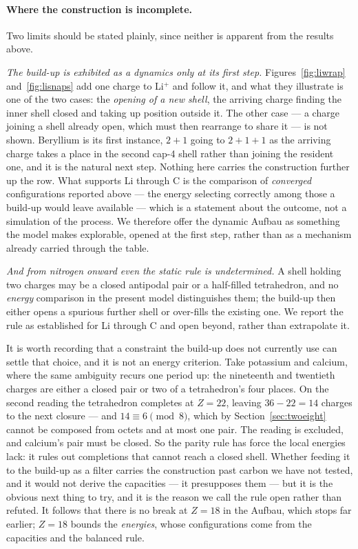\documentclass[11pt]{article}
\begin{document}
\paragraph{Where the construction is incomplete.} Two limits should be stated plainly, since
neither is apparent from the results above.

\emph{The build-up is exhibited as a dynamics only at its first step.} Figures~\ref{fig:liwrap}
and~\ref{fig:lisnaps} add one charge to Li$^+$ and follow it, and what they illustrate is one of
the two cases: the \emph{opening of a new shell}, the arriving charge finding the inner shell
closed and taking up position outside it. The other case --- a charge joining a shell already
open, which must then rearrange to share it --- is not shown. Beryllium is its first instance,
$2{+}1$ going to $2{+}1{+}1$ as the arriving charge takes a place in the second cap-4 shell
rather than joining the resident one, and it is the natural next step. Nothing here carries the construction further up the row. What supports
Li through C is the comparison of \emph{converged} configurations reported above --- the energy
selecting correctly among those a build-up would leave available --- which is a statement about
the outcome, not a simulation of the process. We therefore offer the dynamic Aufbau as
something the model makes explorable, opened at the first step, rather than as a mechanism
already carried through the table.

\emph{And from nitrogen onward even the static rule is undetermined.} A shell holding two
charges may be a closed antipodal pair or a half-filled tetrahedron, and no \emph{energy}
comparison in the present model distinguishes them; the build-up then either opens a spurious
further shell or over-fills the existing one. We report the rule as established for Li through C
and open beyond, rather than extrapolate it.

It is worth recording that a constraint the build-up does not currently use can settle that
choice, and it is not an energy criterion. Take potassium and calcium, where the same ambiguity
recurs one period up: the nineteenth and twentieth charges are either a closed pair or two of a
tetrahedron's four places. On the second reading the tetrahedron completes at $Z=22$, leaving
$36-22=14$ charges to the next closure --- and $14 \equiv 6 \pmod 8$, which by
Section~\ref{sec:twoeight} cannot be composed from octets and at most one pair. The reading is
excluded, and calcium's pair must be closed. So the parity rule has force the
local energies lack: it rules out completions that cannot reach a closed shell. Whether feeding
it to the build-up as a filter carries the construction past carbon we have not tested, and it
would not derive the capacities --- it presupposes them --- but it is the obvious next thing to
try, and it is the reason we call the rule open rather than refuted. It follows that there is no break at $Z=18$ in the Aufbau, which stops far
earlier; $Z=18$ bounds the \emph{energies}, whose configurations come from the capacities and
the balanced rule.
\end{document}
